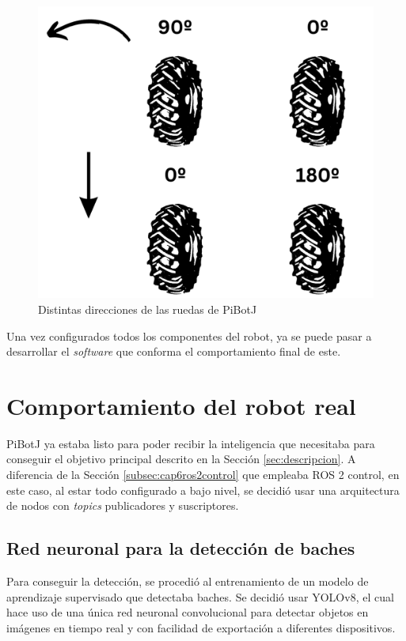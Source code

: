 \begin{figure}[ht!]
\begin{minipage}{0.3\linewidth}
		\includegraphics[width=\linewidth]{figs/cap6/motorlogic2.png}
	\end{minipage}
	\caption{Distintas direcciones de las ruedas de PiBotJ}
	\label{fig:motorlogic}
\end{figure}

Una vez configurados todos los componentes del robot, ya se puede pasar a desarrollar el \textit{software} que conforma el comportamiento final de este. 
 

\section{Comportamiento del robot real}
\label{sec:softwarerf}

PiBotJ ya estaba listo para poder recibir la inteligencia que necesitaba para conseguir el objetivo principal descrito en la Sección \ref{sec:descripcion}. A diferencia de la Sección \ref{subsec:cap6ros2control} que empleaba ROS 2 control, en este caso, al estar todo configurado a bajo nivel, se decidió usar una arquitectura de nodos con \textit{topics} publicadores y suscriptores.

\subsection{Red neuronal para la detección de baches}
\label{subsec:softwareiayolo}

Para conseguir la detección, se procedió al entrenamiento de un modelo de aprendizaje supervisado que detectaba baches. Se decidió usar YOLOv8, el cual hace uso de una única red neuronal convolucional para detectar objetos en imágenes en tiempo real y con facilidad de exportación a diferentes dispositivos.

